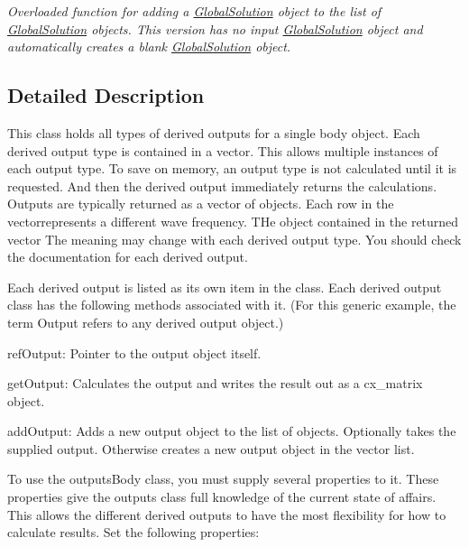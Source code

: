\begin{DoxyCompactItemize}
\begin{DoxyCompactList}\small\item\em Overloaded function for adding a \hyperlink{class_global_solution}{Global\-Solution} object to the list of \hyperlink{class_global_solution}{Global\-Solution} objects. This version has no input \hyperlink{class_global_solution}{Global\-Solution} object and automatically creates a blank \hyperlink{class_global_solution}{Global\-Solution} object. \end{DoxyCompactList}\end{DoxyCompactItemize}


\subsection{Detailed Description}
This class holds all types of derived outputs for a single body object. Each derived output type is contained in a vector. This allows multiple instances of each output type. To save on memory, an output type is not calculated until it is requested. And then the derived output immediately returns the calculations. Outputs are typically returned as a vector of objects. Each row in the vectorrepresents a different wave frequency. T\-He object contained in the returned vector The meaning may change with each derived output type. You should check the documentation for each derived output.

Each derived output is listed as its own item in the class. Each derived output class has the following methods associated with it. (For this generic example, the term Output refers to any derived output object.)
\begin{DoxyEnumerate}
\item ref\-Output\-: Pointer to the output object itself.
\item get\-Output\-: Calculates the output and writes the result out as a cx\-\_\-matrix object.
\item add\-Output\-: Adds a new output object to the list of objects. Optionally takes the supplied output. Otherwise creates a new output object in the vector list.
\end{DoxyEnumerate}

To use the outputs\-Body class, you must supply several properties to it. These properties give the outputs class full knowledge of the current state of affairs. This allows the different derived outputs to have the most flexibility for how to calculate results. Set the following properties\-:

